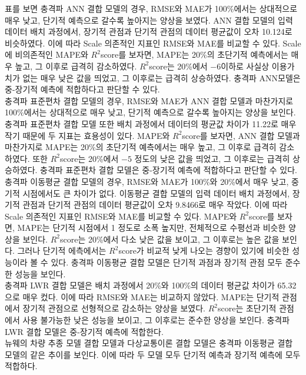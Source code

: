 \documentclass[11pt]{report}
\begin{document}
표를 보면 충격파 ANN 결합 모델의 경우, RMSE와 MAE가 100\%에서는 상대적으로 매우 낮고, 단기적 예측으로 갈수록 높아지는 양상을 보였다. 
ANN 결합 모델의 입력 데이터 배치 과정에서, 장기적 관점과 단기적 관점의 데이터 평균값이 오차 10.124로 비슷하였다. 
이에 따라 Scale 의존적인 지표인 RMSE와 MAE를 비교할 수 있다. 
Scale에 비의존적인 MAPE와 $R^2$score를 보자면, MAPE는 20\%의 초단기적 예측에서는 매우 높고, 그 이후로 급격히 감소하였다. 
$R^2$score는 20\%에서 $-6$이하로 사실상 이용가치가 없는 매우 낮은 값을 띄었고, 그 이후로는 급격히 상승하였다. 
충격파 ANN모델은 중-장기적 예측에 적합하다고 판단할 수 있다. \\
\indent 충격파 표준편차 결합 모델의 경우, RMSE와 MAE가 ANN 결합 모델과 마찬가지로 100\%에서는 상대적으로 매우 낮고, 단기적 예측으로 갈수록 높아지는 양상을 보인다. 
충격파 표준편차 결합 모델 또한 배치 과정에서 데이터의 평균값 차이가 11.22로 매우 작기 때문에 두 지표는 효용성이 있다. 
MAPE와 $R^2$score를 보자면, ANN 결합 모델과 마찬가지로 MAPE는 20\%의 초단기적 예측에서는 매우 높고, 그 이후로 급격히 감소하였다. 
또한 $R^2$score는 20\%에서 $-5$ 정도의 낮은 값을 띄었고, 그 이후로는 급격히 상승하였다. 
충격파 표준편차 결합 모델은 중-장기적 예측에 적합하다고 판단할 수 있다. \\
\indent 충격파 이동평균 결합 모델의 경우, RMSE와 MAE가 100\%와 20\%에서 매우 낮고, 중기적 시점에서도 큰 차이가 없다. 
이동평균 결합 모델의 입력 데이터 배치 과정에서, 장기적 관점과 단기적 관점의 데이터 평균값이 오차 9.8466로 매우 작았다. 
이에 따라 Scale 의존적인 지표인 RMSE와 MAE를 비교할 수 있다. 
MAPE와 $R^2$score를 보자면, MAPE는 단기적 시점에서 1 정도로 소폭 높지만, 전체적으로 수평선과 비슷한 양상을 보인다. 
$R^2$score는 20\%에서 다소 낮은 값을 보이고, 그 이후로는 높은 값을 보인다. 
그러나 단기적 에측에서는 $R^2$score가 비교적 낮게 나오는 경향이 있기에 비슷한 성능이라 볼 수 있다. 
충격파 이동평균 결합 모델은 단기적 과점과 장기적 관점 모두 준수한 성능을 보인다. \\
\indent 충격파 LWR 결합 모델은 배치 과정에서 20\%와 100\%의 데이터 평균값 차이가 65.32으로 매우 컸다. 
이에 따라 RMSE와 MAE는 비교하지 않았다. 
MAPE는 단기적 관점에서 장기적 관점으로 선형적으로 감소하는 양상을 보였다. 
$R^2$score는 초단기적 관점에서 사용 불가능한 낮은 성능을 보이고, 그 이후로는 준수한 양상을 보인다. 
충격파 LWR 결합 모델은 중-장기적 예측에 적합한다. \\
\indent 뉴웨의 차량 추종 모델 결합 모델과 다상교통이론 결합 모델은 충격파 이동평균 결합 모델의 같은 추이를 보인다. 
이에 따라 두 모델 모두 단기적 예측과 장기적 예측에 모두 적합하다. 
\end{document}
